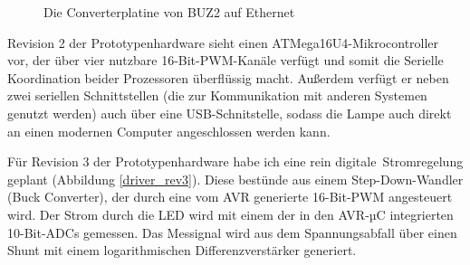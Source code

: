 \documentclass[12pt,a4paper,notitlepage]{article}
\begin{document}
\begin{figure}
\centering
{}
\label{buz2_converter_ethernet}
\caption{Die Converterplatine von BUZ2 auf Ethernet}
\end{figure}

Revision 2 der Prototypenhardware sieht einen ATMega16U4-Mikrocontroller vor, der über vier nutzbare 16-Bit-PWM-Kanäle verfügt und somit die Serielle Koordination beider Prozessoren überflüssig macht. Außerdem verfügt er neben zwei seriellen Schnittstellen (die zur Kommunikation mit anderen Systemen genutzt werden) auch über eine USB-Schnitstelle, sodass die Lampe auch direkt an einen modernen Computer angeschlossen werden kann.

Für Revision 3 der Prototypenhardware habe ich eine rein \glqq digitale\grqq\ Stromregelung geplant (Abbildung \ref{driver_rev3}). Diese bestünde aus einem Step-Down-Wandler (Buck Converter)\cite{MAXIM24,MAXIM70,NATIONAL4,SPRUT1,MAXIM49},%
der durch eine vom AVR generierte 16-Bit-PWM angesteuert wird. Der Strom durch die LED wird mit einem der in den AVR-µC integrierten 10-Bit-ADCs gemessen. Das Messignal wird aus dem Spannungsabfall über einen Shunt %
mit einem logarithmischen Differenzverstärker generiert\cite{MAXIM34}.
\end{document}
